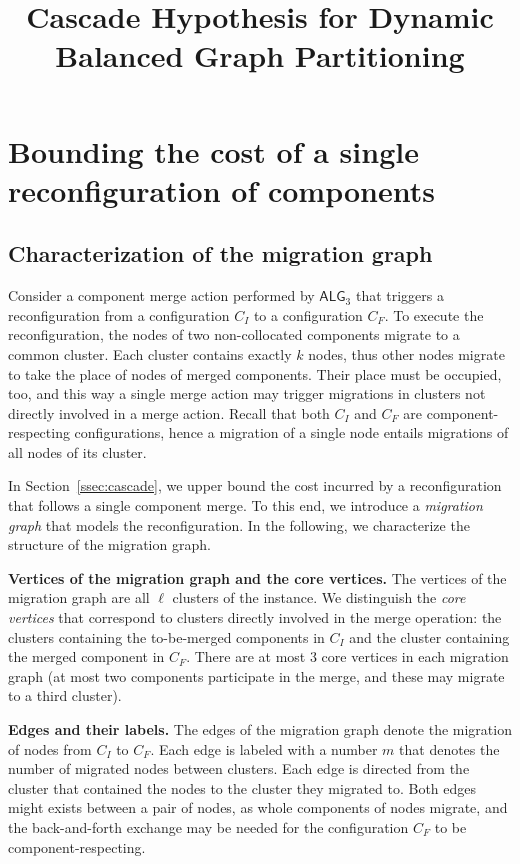 \documentclass[]{article}
\title{Cascade Hypothesis for Dynamic Balanced Graph Partitioning}
\date{}
\newcommand{\TAlg}{{\ensuremath{\textsf{ALG}_{3}}}\xspace}
\begin{document}
\maketitle



\section{Bounding the cost of a single reconfiguration of components}


\subsection{Characterization of the migration graph}

Consider a component merge action performed by \TAlg that triggers a reconfiguration from a configuration $C_I$ to a configuration $C_F$.
To execute the reconfiguration, the nodes of two non-collocated components migrate to a common cluster.
Each cluster contains exactly $k$ nodes, thus other nodes migrate to take the place of nodes of merged components.
Their place must be occupied, too, and this way a single merge action may trigger migrations in clusters not directly involved in a merge action. 
Recall that both $C_I$ and $C_F$ are component-respecting configurations, hence a migration of a single node entails migrations of all nodes of its cluster.

In Section~\ref{ssec:cascade}, we upper bound the cost incurred by a reconfiguration that follows a single component merge.
To this end, we introduce a \emph{migration graph} that models the reconfiguration.
In the following, we characterize the structure of the migration graph.

\noindent
\textbf{Vertices of the migration graph and the core vertices.}
The vertices of the migration graph are all $\ell$ clusters of the instance.
We distinguish the \emph{core vertices} that correspond to clusters directly involved in the merge operation: the clusters containing the to-be-merged components in $C_I$ and the cluster containing the merged component in $C_F$.
There are at most $3$ core vertices in each migration graph (at most two components participate in the merge, and these may migrate to a third cluster).

\noindent
\textbf{Edges and their labels.}
The edges of the migration graph denote the migration of nodes from $C_I$ to $C_F$.
Each edge is labeled with a number $m$ that denotes the number of migrated nodes between clusters.
Each edge is directed from the cluster that contained the nodes to the cluster they migrated to.
Both edges might exists between a pair of nodes, as whole components of nodes migrate, and the back-and-forth exchange may be needed for the configuration $C_F$ to be component-respecting.
\end{document}
